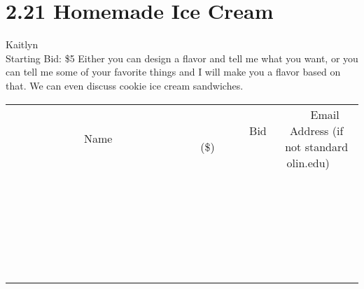 \documentclass[11pt]{article}
\begin{document}
\section*{2.21 Homemade Ice Cream}
Kaitlyn
\\
Starting Bid: \$5
\newline
Either you can design a flavor and tell me what you want, or you can tell me some of your favorite things and I will make you a flavor based on that. We can even discuss cookie ice cream sandwiches.
\\[6ex]
\begin{tabular}{c c c}
~~~~~~~~~~~~~Name~~~~~~~~~~~~~ & ~~~~~~~~~Bid (\$)~~~~~~~~~  & ~~~Email Address (if not standard olin.edu)~~~\\
 & & \\
\hline
 & & \\
\hline
 & & \\
\hline
 & & \\
\hline
 & & \\
\hline
 & & \\
\hline
 & & \\
\hline
 & & \\
\hline
 & & \\
\hline
 & & \\
\hline
 & & \\
\hline
 & & \\
\hline
 & & \\
\hline
 & & \\
\hline
 & & \\
\hline
 & & \\
\hline
 & & \\
\hline
 & & \\
\hline
 & & \\
\hline
 & & \\
\hline
 & & \\
\hline
 & & \\
\hline
 & & \\
\hline
 & & \\
\hline
 & & \\
\hline
 & & \\
\hline
\end{tabular}
\newpage
\end{document}

